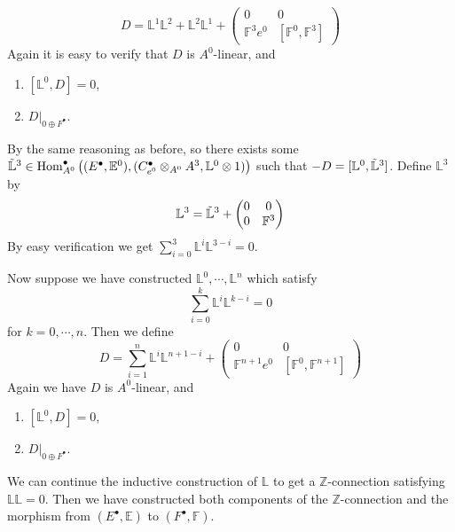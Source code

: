 \documentclass[12pt]{amsart}
\theoremstyle{definition}
\theoremstyle{remark}
\numberwithin{equation}{section}
\newcommand{\A}{{A}}
\newcommand{\Z}{{\mathbb{Z}}}
\newcommand{\1}{{\mathbb{1}}}
\newcommand{\bt}{\bullet}
\newcommand{\Hom}{\operatorname{Hom}}
\begin{document}
\begin{equation*}
    D = \mathbb{L}^1\mathbb{L}^2 + \mathbb{L}^2\mathbb{L}^1 + \begin{pmatrix}
0 & 0 \\
\mathbb{F}^3e^0 & [\mathbb{F}^0, \mathbb{F}^3]
\end{pmatrix}
\end{equation*}
Again it is easy to verify that $D$ is $\A^0$-linear, and 
\begin{enumerate}
    \item $[\mathbb{L}^0, D] = 0$,\\
    \item $D|_{0\oplus F^{\bt}}$.
\end{enumerate}
By the same reasoning as before, so there exists some $\Tilde{\mathbb{L}}^3 \in \Hom^{\bt}_{\A^0}\big( (E^{\bt}, \mathbb{E}^0), (C_{e^0}^{\bt}\otimes_{\A^0} \A^3, \mathbb{L}^0\otimes 1) \big)$ such that $-D = [\mathbb{L}^0,\Tilde{\mathbb{L}}^3]$. Define $\mathbb{L}^3$ by
$$
\mathbb{L}^3 = \Tilde{\mathbb{L}}^3 + \begin{pmatrix}
0 & 0 \\
0 & \mathbb{F}^3
\end{pmatrix}
$$
By easy verification we get $\sum_{i=0}^3\mathbb{L}^i \mathbb{L}^{3-i} = 0$.

Now suppose we have constructed $\mathbb{L}^0, \cdots, \mathbb{L}^n$ which satisfy
\begin{equation*}
    \sum_{i = 0}^k \mathbb{L}^i \mathbb{L}^{k-i} = 0
\end{equation*}
for $k = 0,\cdots, n$.
Then we define 
\begin{equation*}
    D = \sum_{i = 1}^n  \mathbb{L}^i \mathbb{L}^{n + 1 -i} + \begin{pmatrix}
0 & 0 \\
\mathbb{F}^{n+1}e^0 & [\mathbb{F}^0, \mathbb{F}^{n+1}]
\end{pmatrix}
\end{equation*}
Again we have $D$ is $\A^0$-linear, and 
\begin{enumerate}
    \item $[\mathbb{L}^0, D] = 0$,\\
    \item $D|_{0\oplus F^{\bt}}$.
\end{enumerate}
We can continue the inductive construction of $\mathbb{L}$ to get a $\Z$-connection satisfying $\mathbb{L} \mathbb{L} = 0$. Then we have constructed both components of the $\Z$-connection and the morphism from $(E^{\bt}, \mathbb{E})$ to $(F^{\bt}, \mathbb{F})$.
\end{document}
